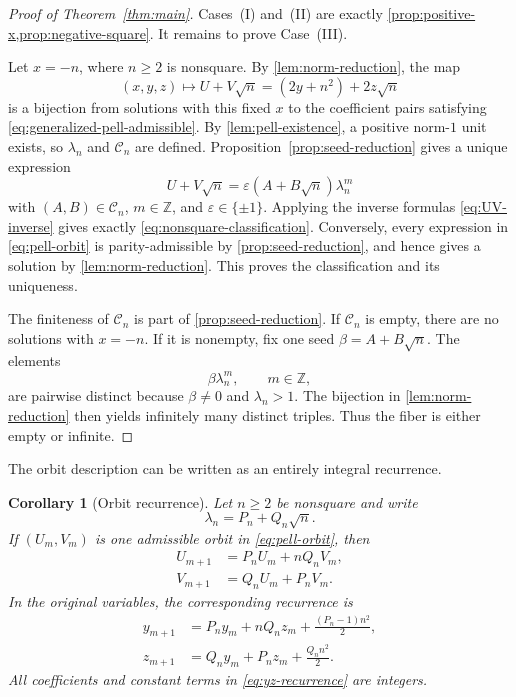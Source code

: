 \documentclass[a4paper,11pt]{amsart}
\newtheorem{corollary}[corollary]{Corollary}
\theoremstyle{definition}
\theoremstyle{remark}
\newcommand{\Z}{\mathbb Z}
\newcommand{\eps}{\varepsilon}
\begin{document}
\begin{proof}[Proof of Theorem~\ref{thm:main}]
Cases~\textup{(I)} and~\textup{(II)} are exactly \cref{prop:positive-x,prop:negative-square}.  It remains to prove Case~\textup{(III)}.

Let $x=-n$, where $n\ge2$ is nonsquare.  By \cref{lem:norm-reduction}, the map
\[
(x,y,z)\longmapsto U+V\sqrt n=(2y+n^2)+2z\sqrt n
\]
is a bijection from solutions with this fixed $x$ to the coefficient pairs satisfying \eqref{eq:generalized-pell-admissible}.  By \cref{lem:pell-existence}, a positive norm-$1$ unit exists, so $\lambda_n$ and $\mathcal C_n$ are defined.  Proposition~\ref{prop:seed-reduction} gives a unique expression
\[
U+V\sqrt n
 =\eps(A+B\sqrt n)\lambda_n^m
\]
with $(A,B)\in\mathcal C_n$, $m\in\Z$, and $\eps\in\{\pm1\}$.  Applying the inverse formulas \eqref{eq:UV-inverse} gives exactly \eqref{eq:nonsquare-classification}.  Conversely, every expression in \eqref{eq:pell-orbit} is parity-admissible by \cref{prop:seed-reduction}, and hence gives a solution by \cref{lem:norm-reduction}.  This proves the classification and its uniqueness.

The finiteness of $\mathcal C_n$ is part of \cref{prop:seed-reduction}.  If $\mathcal C_n$ is empty, there are no solutions with $x=-n$.  If it is nonempty, fix one seed $\beta=A+B\sqrt n$.  The elements
\[
\beta\lambda_n^m,
\qquad m\in\Z,
\]
are pairwise distinct because $\beta\ne0$ and $\lambda_n>1$.  The bijection in \cref{lem:norm-reduction} then yields infinitely many distinct triples.  Thus the fiber is either empty or infinite.
\end{proof}

The orbit description can be written as an entirely integral recurrence.

\begin{corollary}[Orbit recurrence]\label{cor:recurrence}
Let $n\ge2$ be nonsquare and write
\[
\lambda_n=P_n+Q_n\sqrt n.
\]
If $(U_m,V_m)$ is one admissible orbit in \eqref{eq:pell-orbit}, then
\begin{equation}\label{eq:UV-recurrence}
\begin{aligned}
U_{m+1}&=P_nU_m+nQ_nV_m,\\
V_{m+1}&=Q_nU_m+P_nV_m.
\end{aligned}
\end{equation}
In the original variables, the corresponding recurrence is
\begin{equation}\label{eq:yz-recurrence}
\begin{aligned}
y_{m+1}
 &=P_ny_m+nQ_nz_m+\frac{(P_n-1)n^2}{2},\\
z_{m+1}
 &=Q_ny_m+P_nz_m+\frac{Q_nn^2}{2}.
\end{aligned}
\end{equation}
All coefficients and constant terms in \eqref{eq:yz-recurrence} are integers.
\end{corollary}
\end{document}
